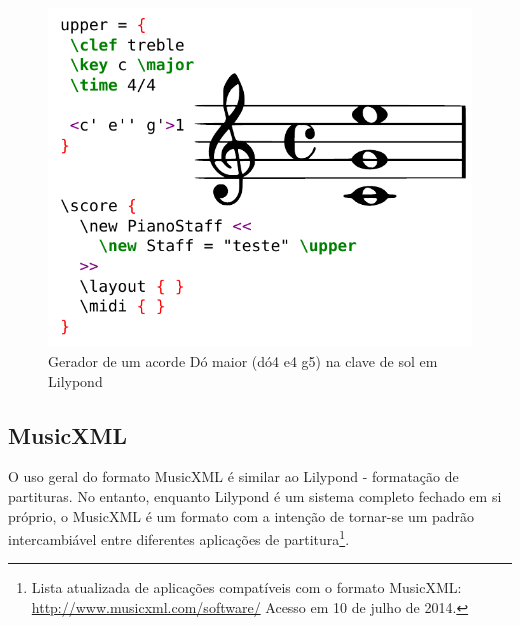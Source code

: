 \documentclass[
	12pt,				%
	openright,			%
	twoside,			%
	a4paper,			%
	english,			%
	french,				%
	spanish,			%
	brazil				%
	]{abntex2}
\begin{document}
\begin{figure}[htb]
	\caption{\label{fig_grafico}Gerador de um acorde Dó maior (dó4 e4 g5) na clave de sol em Lilypond}
	\begin{center}
	    \includegraphics[scale=0.75]{score/lilypond.pdf}
	\end{center}
\end{figure}


\subsection{MusicXML}

O uso geral do formato MusicXML é similar ao Lilypond - formatação de partituras. No entanto, enquanto Lilypond é um sistema completo fechado em si próprio, o MusicXML é um formato com a intenção de tornar-se um padrão intercambiável entre diferentes aplicações de partitura\footnote{ Lista atualizada de aplicações compatíveis com o formato MusicXML: \url{http://www.musicxml.com/software/} Acesso em 10 de julho de 2014.}.
\end{document}
